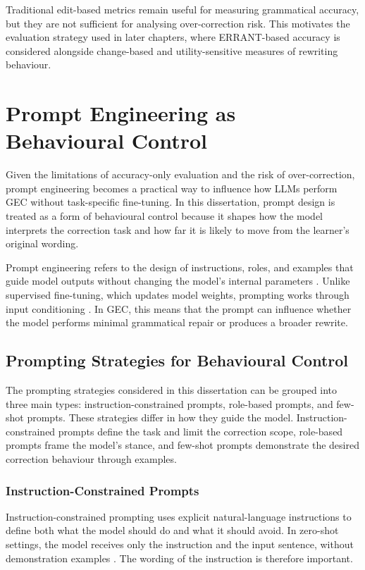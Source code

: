 Traditional edit-based metrics remain useful for measuring grammatical accuracy, but they are not sufficient for analysing over-correction risk. This motivates the evaluation strategy used in later chapters, where ERRANT-based accuracy is considered alongside change-based and utility-sensitive measures of rewriting behaviour.

\section{Prompt Engineering as Behavioural Control}

Given the limitations of accuracy-only evaluation and the risk of over-correction, prompt engineering becomes a practical way to influence how LLMs perform GEC without task-specific fine-tuning. In this dissertation, prompt design is treated as a form of behavioural control because it shapes how the model interprets the correction task and how far it is likely to move from the learner's original wording.

Prompt engineering refers to the design of instructions, roles, and examples that guide model outputs without changing the model's internal parameters \cite{liu2023pretrain}. Unlike supervised fine-tuning, which updates model weights, prompting works through input conditioning \cite{NEURIPS2020_1457c0d6}. In GEC, this means that the prompt can influence whether the model performs minimal grammatical repair or produces a broader rewrite.

\subsection{Prompting Strategies for Behavioural Control}

The prompting strategies considered in this dissertation can be grouped into three main types: instruction-constrained prompts, role-based prompts, and few-shot prompts. These strategies differ in how they guide the model. Instruction-constrained prompts define the task and limit the correction scope, role-based prompts frame the model's stance, and few-shot prompts demonstrate the desired correction behaviour through examples.

\subsubsection{Instruction-Constrained Prompts}

Instruction-constrained prompting uses explicit natural-language instructions to define both what the model should do and what it should avoid. In zero-shot settings, the model receives only the instruction and the input sentence, without demonstration examples \cite{NEURIPS2020_1457c0d6}. The wording of the instruction is therefore important.

